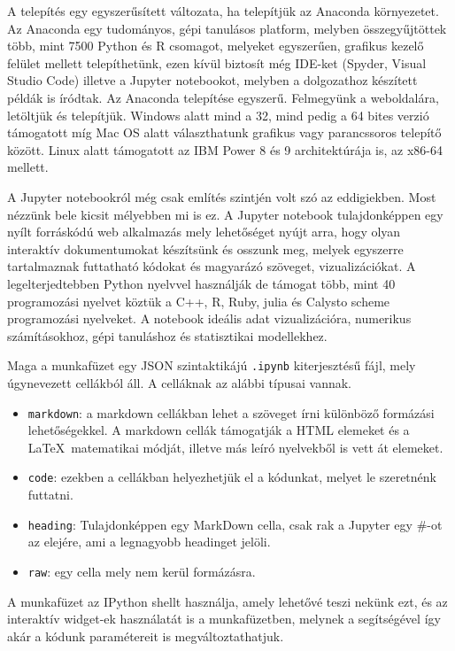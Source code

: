 
    A telepítés egy egyszerűsített változata, ha telepítjük az Anaconda
környezetet. Az Anaconda egy tudományos, gépi tanulásos platform,
melyben összegyűjtöttek több, mint 7500 Python és R csomagot, melyeket
egyszerűen, grafikus kezelő felület mellett telepíthetünk, ezen kívül
biztosít még IDE-ket (Spyder, Visual Studio Code) illetve a Jupyter
notebookot, melyben a dolgozathoz készített példák is íródtak. Az Anaconda telepítése
egyszerű. Felmegyünk a weboldalára, letöltjük és telepítjük.
Windows
alatt mind a 32, mind pedig a 64 bites verzió támogatott míg Mac OS alatt
választhatunk grafikus vagy parancssoros telepítő között.
Linux alatt támogatott az IBM Power 8 és 9 architektúrája is, az x86-64
mellett.


A Jupyter notebookról még csak említés szintjén volt szó az eddigiekben. Most nézzünk
bele kicsit mélyebben mi is ez. A Jupyter notebook tulajdonképpen egy
nyílt forráskódú web alkalmazás mely lehetőséget nyújt arra, hogy olyan
interaktív dokumentumokat készítsünk és osszunk meg, melyek egyszerre
tartalmaznak futtatható kódokat és magyarázó szöveget, vizualizációkat.
A legelterjedtebben Python nyelvvel használják de támogat több, mint 40
programozási nyelvet köztük a C++, R, Ruby, julia és Calysto scheme
programozási nyelveket.
A notebook ideális adat vizualizációra,
numerikus számításokhoz, gépi tanuláshoz és statisztikai modellekhez.

Maga a munkafüzet egy JSON szintaktikájú \texttt{.ipynb} kiterjesztésű fájl, mely
úgynevezett cellákból áll. A celláknak az alábbi típusai vannak.
\begin{itemize}
\item \texttt{markdown}: a markdown cellákban lehet a szöveget írni különböző
formázási lehetőségekkel. A markdown cellák támogatják a HTML elemeket
és a \LaTeX\ matematikai módját, illetve más leíró nyelvekből is vett át
elemeket.
\item \texttt{code}: ezekben a cellákban helyezhetjük el a
kódunkat, melyet le szeretnénk futtatni.
\item \texttt{heading}:
Tulajdonképpen egy MarkDown cella, csak rak a Jupyter egy \#-ot az
elejére, ami a legnagyobb headinget jelöli.
\item \texttt{raw}: egy cella mely
nem kerül formázásra.
\end{itemize}
A munkafüzet az IPython shellt használja, amely lehetővé teszi nekünk
ezt, és az interaktív widget-ek használatát is a munkafüzetben, melynek a
segítségével így akár a kódunk paramétereit is megváltoztathatjuk.
